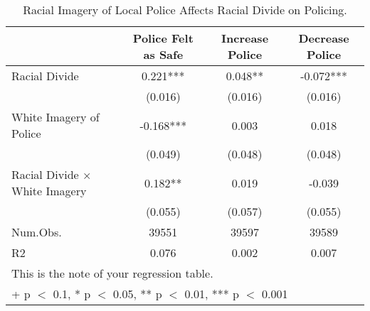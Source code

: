 \begin{table}

\caption{Racial Imagery of Local Police Affects Racial Divide on Policing.}
\centering
\begin{tabular}[t]{lccc}
\toprule
  & Police Felt as Safe & Increase Police & Decrease Police\\
\midrule
Racial Divide & 0.221*** & 0.048** & -0.072***\\
 & (0.016) & (0.016) & (0.016)\\
White Imagery of Police & -0.168*** & 0.003 & 0.018\\
 & (0.049) & (0.048) & (0.048)\\
Racial Divide × White Imagery & 0.182** & 0.019 & -0.039\\
 & (0.055) & (0.057) & (0.055)\\
\midrule
Num.Obs. & 39551 & 39597 & 39589\\
R2 & 0.076 & 0.002 & 0.007\\
\bottomrule
\multicolumn{4}{l}{\rule{0pt}{1em}This is the note of your regression table.}\\
\multicolumn{4}{l}{\rule{0pt}{1em}+ p $<$ 0.1, * p $<$ 0.05, ** p $<$ 0.01, *** p $<$ 0.001}\\
\end{tabular}
\end{table}
